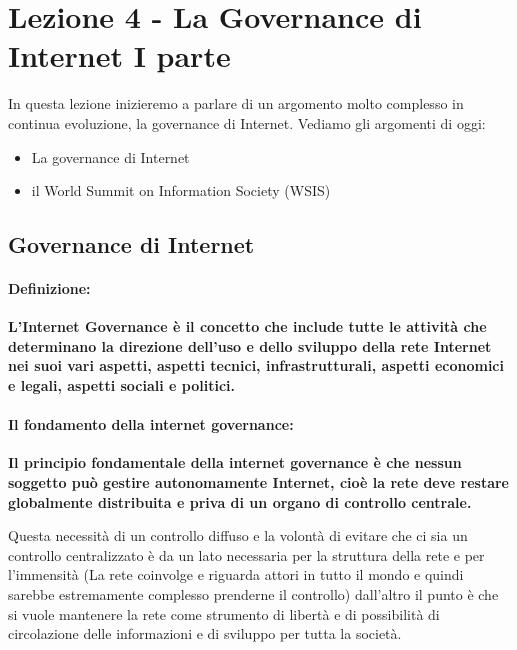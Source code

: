 \chapter{Lezione 4 - La Governance di Internet I parte}

 In questa lezione inizieremo a parlare di un argomento molto complesso in continua evoluzione, la governance di Internet. Vediamo gli argomenti di oggi:
 \begin{itemize}
     \item La governance di Internet
     \item il World Summit on Information Society (WSIS)
 \end{itemize}

 \section{Governance di Internet}
 \subsubsection{Definizione:}
  \textbf{L'Internet Governance è il concetto che include tutte le attività che determinano la direzione dell'uso e dello sviluppo della rete Internet nei suoi vari aspetti, aspetti tecnici, infrastrutturali, aspetti economici e legali, aspetti sociali e politici.}
  
  \subsubsection{Il fondamento della internet governance:}
  \textbf{Il principio fondamentale della internet governance è che nessun soggetto può gestire autonomamente Internet, cioè la rete deve restare globalmente distribuita e priva di un organo di controllo centrale.} \par
 Questa necessità di un controllo diffuso e la volontà di evitare che ci sia un controllo centralizzato è da un lato necessaria per la struttura della rete e per l'immensità (La rete coinvolge e riguarda attori in tutto il mondo e quindi sarebbe estremamente complesso prenderne il controllo) dall'altro il punto è che si vuole mantenere la rete come strumento di libertà e di possibilità di circolazione delle informazioni e di sviluppo per tutta la società. 
 
